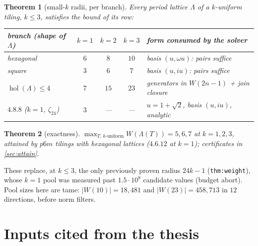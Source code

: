 \documentclass[11pt,a4paper,oneside]{article}
\theoremstyle{plain}
\newtheorem{theorem}{Theorem}[section]
\theoremstyle{definition}
\theoremstyle{remark}
\DeclareMathOperator{\hol}{hol}
\newcommand{\zt}[1]{\zeta_{#1}}
\begin{document}
\begin{theorem}[small-$k$ radii, per branch]\label{thm:main}
Every period lattice $\Lambda$ of a $k$-uniform tiling, $k \le 3$, satisfies the bound of
its row:
\begin{center}
\begin{tabular}{lcccl}
\toprule
branch (shape of $\Lambda$) & $k=1$ & $k=2$ & $k=3$ & form consumed by the solver\\
\midrule
hexagonal & $6$ & $8$ & $10$ & basis $(u, \omega u)$: pairs suffice\\
square & $3$ & $6$ & $7$ & basis $(u, iu)$: pairs suffice\\
$\hol(\Lambda) \le 4$ & $7$ & $15$ & $23$ & generators in $W(2n{-}1)$ + join closure\\
$4.8.8$ ($k=1$, $\zt{24}$) & $3$ & --- & --- & $u = 1{+}\sqrt2$, basis $(u, iu)$, analytic\\
\bottomrule
\end{tabular}
\end{center}
\end{theorem}

\begin{theorem}[exactness]\label{thm:exact}
$\max_{T,\, k\text{-uniform}} W(\Lambda(T)) = 5, 6, 7$ at $k = 1, 2, 3$, attained by $p6m$
tilings with hexagonal lattices ($4.6.12$ at $k=1$); certificates in \cref{sec:attain}.
\end{theorem}

These replace, at $k \le 3$, the only previously proven radius $24k-1$
(\texttt{thm:weight}), whose $k=1$ pool was measured past $1.5\cdot10^8$ candidate values
(budget abort). Pool sizes here are tame: $|W(10)| = 18{,}481$ and $|W(23)| = 458{,}713$ in
$12$ directions, before norm filters.

\section{Inputs cited from the thesis}\label{sec:inputs}
\end{document}
